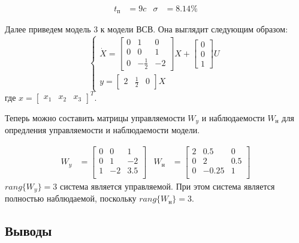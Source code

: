 \documentclass[a4paper, 12pt]{article}
\begin{document}
\begin{align*}
t_\text{п} & = 9 c & \sigma & = 8.14\%
\end{align*} \par
Далее приведем модель 3 к модели ВСВ. Она выглядит следующим образом:
\begin{equation}
\begin{cases}
\dot{X} = \begin{bmatrix}
0 & 1 & 0 \\
0 & 0 & 1 \\
0 & -\frac{1}{2} & -2
\end{bmatrix}X + \begin{bmatrix}
0 \\ 0 \\ 1
\end{bmatrix}U \\
y = \begin{bmatrix}2 & \frac{1}{2} & 0\end{bmatrix} X
\end{cases}
\end{equation}
где $x = \begin{bmatrix} x_1 & x_2 & x_3 \end{bmatrix}^T$.
\newpage
\par
Теперь можно составить матрицы управляемости $W_y$ и наблюдаемости $W_\text{н}$ для опредления управляемости и наблюдаемости модели.

\begin{align*}
W_y & = \begin{bmatrix}
0 & 0 & 1 \\
0 & 1 & -2 \\
1 & -2 & 3.5 \\
\end{bmatrix} & 
W_\text{н} & = \begin{bmatrix}
2 & 0.5 & 0 \\
0 & 2 & 0.5 \\
0 & -0.25 & 1 \\
\end{bmatrix}
\end{align*}
 $rang\{W_y\} = 3$ система является управляемой. При этом система является полностью наблюдаемой, поскольку $rang\{W_\text{н}\} = 3$.

\newpage
\begin{center}
	\section*{Выводы}
\end{center}
\end{document}
